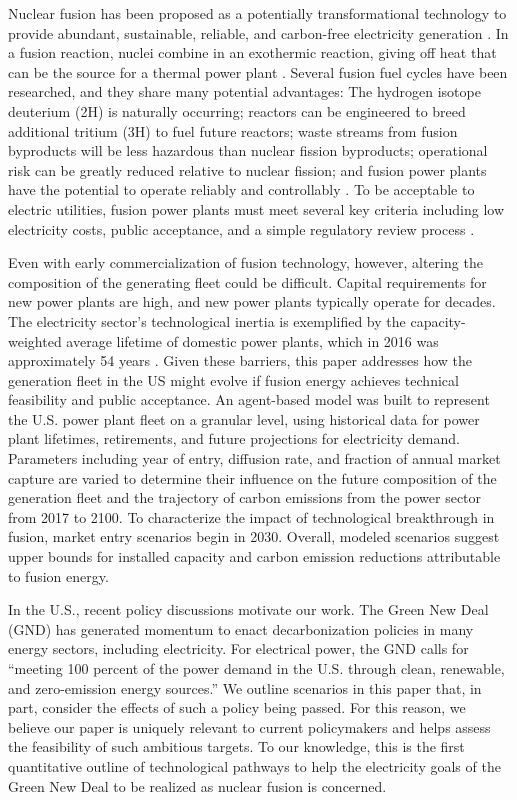 \documentclass[review]{elsarticle}
\begin{document}
Nuclear fusion has been proposed as a potentially transformational technology to provide abundant, sustainable, reliable, and carbon-free electricity generation \citep{Chou2016}. In a fusion reaction, nuclei combine in an exothermic reaction, giving off heat that can be the source for a thermal power plant \citep{Chou2016}. Several fusion fuel cycles have been researched, and they share many potential advantages: The hydrogen isotope deuterium (2H) is naturally occurring; reactors can be engineered to breed additional tritium (3H) to fuel future reactors; waste streams from fusion byproducts will be less hazardous than nuclear fission byproducts; operational risk can be greatly reduced relative to nuclear fission; and fusion power plants have the potential to operate reliably and controllably \citep{Chou2016}. To be acceptable to electric utilities, fusion power plants must meet several key criteria including low electricity costs, public acceptance, and a simple regulatory review process \citep{Kaslow1994}.

Even with early commercialization of fusion technology, however, altering the composition of the generating fleet could be difficult.\citep{Tokimatsu2002} Capital requirements for new power plants are high, and new power plants typically operate for decades. The electricity sector's technological inertia is exemplified by the capacity-weighted average lifetime of domestic power plants, which in 2016 was approximately 54 years \citep{EIA2016}. Given these barriers, this paper addresses how the generation fleet in the US might evolve if fusion energy achieves technical feasibility and public acceptance. An agent-based model was built to represent the U.S. power plant fleet on a granular level, using historical data for power plant lifetimes, retirements, and future projections for electricity demand. Parameters including year of entry, diffusion rate, and fraction of annual market capture are varied to determine their influence on the future composition of the generation fleet and the trajectory of carbon emissions from the power sector from 2017 to 2100. To characterize the impact of technological breakthrough in fusion, market entry scenarios begin in 2030. Overall, modeled scenarios suggest upper bounds for installed capacity and carbon emission reductions attributable to fusion energy.

In the U.S., recent policy discussions motivate our work. The Green New Deal (GND) has generated momentum to enact decarbonization policies in many energy sectors, including electricity. For electrical power, the GND calls for ``meeting 100 percent of the power demand in the U.S. through clean, renewable, and zero-emission energy sources.'' \citep{GND2019} We outline scenarios in this paper that, in part, consider the effects of such a policy being passed. For this reason, we believe our paper is uniquely relevant to current policymakers and helps assess the feasibility of such ambitious targets. To our knowledge, this is the first quantitative outline of technological pathways to help the electricity goals of the Green New Deal to be realized as nuclear fusion is concerned.
\end{document}
